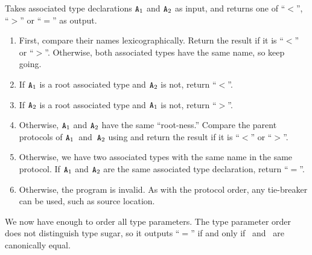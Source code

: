 \documentclass[../generics]{subfiles}
\begin{document}
%
\begin{algorithm}\label{associated type order}%
Takes associated type declarations $\texttt{A}_1$ and $\texttt{A}_2$ as input, and returns one of ``$<$'', ``$>$'' or ``$=$'' as output.
\begin{enumerate}
\item First, compare their names lexicographically. Return the result if it is ``$<$'' or ``$>$''. Otherwise, both associated types have the same name, so keep going.
\item If $\texttt{A}_1$ is a root associated type and $\texttt{A}_2$ is not, return ``$<$''.
\item If $\texttt{A}_2$ is a root associated type and $\texttt{A}_1$ is not, return ``$>$''.
\item Otherwise, $\texttt{A}_1$ and $\texttt{A}_2$ have the same ``root-ness.'' Compare the parent protocols of $\texttt{A}_1$~and~$\texttt{A}_2$ using  and return the result if it is ``$<$'' or ``$>$''.
\item Otherwise, we have two associated types with the same name in the same protocol. If $\texttt{A}_1$ and $\texttt{A}_2$ are the same associated type declaration, return ``$=$''.
\item Otherwise, the program is invalid. As with the protocol order, any tie-breaker can be used, such as source location.
\end{enumerate}
\end{algorithm}

We now have enough to order all type parameters. The type parameter order does not distinguish type sugar, so it outputs ``$=$'' if and only if \tT\ and \tU\ are canonically equal.
\end{document}
